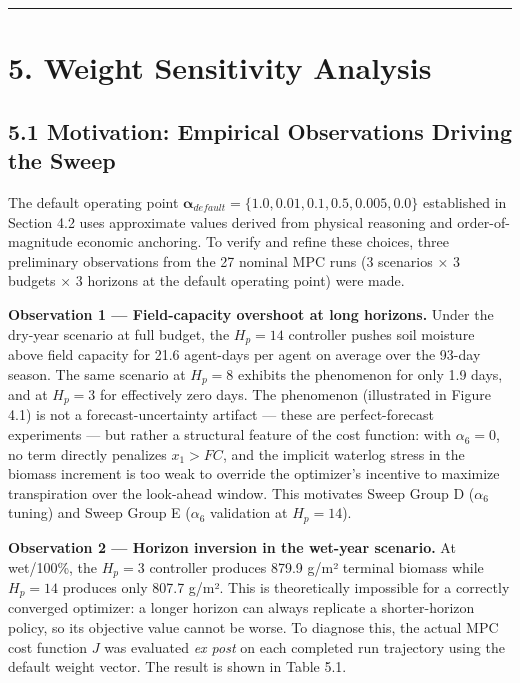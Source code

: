 \begin{center}\rule{0.5\linewidth}{0.5pt}\end{center}

\section{5. Weight Sensitivity
Analysis}\label{weight-sensitivity-analysis}

\subsection{5.1 Motivation: Empirical Observations Driving the
Sweep}\label{motivation-empirical-observations-driving-the-sweep}

The default operating point
\(\boldsymbol{\alpha}_{default} = \{1.0, 0.01, 0.1, 0.5, 0.005, 0.0\}\)
established in Section 4.2 uses approximate values derived from physical
reasoning and order-of-magnitude economic anchoring. To verify and
refine these choices, three preliminary observations from the 27 nominal
MPC runs (3 scenarios × 3 budgets × 3 horizons at the default operating
point) were made.

\textbf{Observation 1 --- Field-capacity overshoot at long horizons.}
Under the dry-year scenario at full budget, the \(H_p = 14\) controller
pushes soil moisture above field capacity for 21.6 agent-days per agent
on average over the 93-day season. The same scenario at \(H_p = 8\)
exhibits the phenomenon for only 1.9 days, and at \(H_p = 3\) for
effectively zero days. The phenomenon (illustrated in Figure 4.1) is not
a forecast-uncertainty artifact --- these are perfect-forecast
experiments --- but rather a structural feature of the cost function:
with \(\alpha_6 = 0\), no term directly penalizes \(x_1 > FC\), and the
implicit waterlog stress in the biomass increment is too weak to
override the optimizer's incentive to maximize transpiration over the
look-ahead window. This motivates Sweep Group D (\(\alpha_6\) tuning)
and Sweep Group E (\(\alpha_6\) validation at \(H_p = 14\)).

\textbf{Observation 2 --- Horizon inversion in the wet-year scenario.}
At wet/100\%, the \(H_p = 3\) controller produces 879.9 g/m² terminal
biomass while \(H_p = 14\) produces only 807.7 g/m². This is
theoretically impossible for a correctly converged optimizer: a longer
horizon can always replicate a shorter-horizon policy, so its objective
value cannot be worse. To diagnose this, the actual MPC cost function
\(J\) was evaluated \emph{ex post} on each completed run trajectory
using the default weight vector. The result is shown in Table 5.1.

